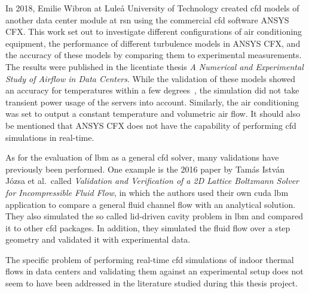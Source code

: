 In 2018, Emilie Wibron at Lule\r{a} University of Technology created \gls{cfd} models of another data center module at \gls{rsn} using the commercial \gls{cfd} software ANSYS CFX. This work set out to investigate different configurations of air conditioning equipment, the performance of different turbulence models in ANSYS CFX, and the accuracy of these models by comparing them to experimental measurements. The results were published in the licentiate thesis \textit{A Numerical and Experimental
Study of Airflow in Data Centers}\cite{Wibron}. While the validation of these models showed an accuracy for temperatures within a few degrees~\cites[pg.32]{Wibron}, the simulation did not take transient power usage of the servers into account. Similarly, the air conditioning was set to output a constant temperature and volumetric air flow. It should also be mentioned that ANSYS CFX does not have the capability of performing \gls{cfd} simulations in real-time.

As for the evaluation of \gls{lbm} as a general \gls{cfd} solver, many validations have previously been performed. One example is the 2016 paper by Tam\'as Istv\'an J\'ozsa et al.~called \textit{Validation and Verification of a 2D Lattice Boltzmann Solver for Incompressible Fluid Flow}\cite{Validation1}, in which the authors used their own \gls{cuda} \gls{lbm} application to compare a general fluid channel flow with an analytical solution. They also simulated the so called lid-driven cavity problem in \gls{lbm} and compared it to other \gls{cfd} packages. In addition, they simulated the fluid flow over a step geometry and validated it with experimental data.

The specific problem of performing real-time \gls{cfd} simulations of indoor thermal flows in data centers and validating them against an experimental setup does not seem to have been addressed in the literature studied during this thesis project. 
